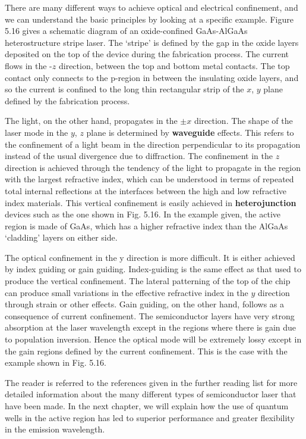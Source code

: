 \documentclass[12pt]{book}
\begin{document}
There are many different ways to achieve optical and electrical confinement, and we can understand the basic principles by looking at a specific example. Figure 5.16 gives a schematic diagram of an oxide-confined GaAs-AlGaAs heterostructure stripe laser. The `stripe' is defined by the gap in the oxide layers deposited on the top of the device during the fabrication process. The current flows in the -$z$ direction, between the top and bottom metal contacts. The top contact only connects to the p-region in between the insulating oxide layers, and so the current is confined to the long thin rectangular strip of the $x$, $y$ plane defined by the fabrication process.

The light, on the other hand, propagates in the $\pm x$ direction. The shape of the laser mode in the $y$, $z$ plane is determined by \textbf{waveguide} effects. This refers to the confinement of a light beam in the direction perpendicular to its propagation instead of the usual divergence due to diffraction. The confinement in the $z$ direction is achieved through the tendency of the light to propagate in the region with the largest refractive index, which can be understood in terms of repeated total internal reflections at the interfaces between the high and low refractive index materials. This vertical confinement is easily achieved in \textbf{heterojunction} devices such as the one shown in Fig. 5.16. In the example given, the active region is made of GaAs, which has a higher refractive index than the AlGaAs `cladding' layers on either side.

The optical confinement in the y direction is more difficult. It is either achieved by index guiding or gain guiding. Index-guiding is the same effect as that used to produce the vertical confinement. The lateral patterning of the top of the chip can produce small variations in the effective refractive index in the $y$ direction through strain or other effects. Gain guiding, on the other hand, follows as a consequence of current confinement. The semiconductor layers have very strong absorption at the laser wavelength except in the regions where there is gain due to population inversion. Hence the optical mode will be extremely lossy except in the gain regions defined by the current confinement. This is the case with the example shown in Fig. 5.16.

The reader is referred to the references given in the further reading list for more detailed information about the many different types of semiconductor laser that have been made. In the next chapter, we will explain how the use of quantum wells in the active region has led to superior performance and greater flexibility in the emission wavelength.
\end{document}
